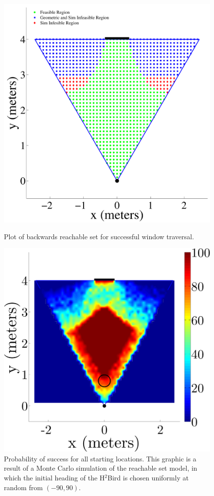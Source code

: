 \documentclass{aamas2013}
\begin{document}
\begin{figure}[tb]
\begin{minipage}[b]{0.45\linewidth}
\includegraphics[width=\textwidth]{figures/feasible_set.pdf}
\caption{Plot of backwards reachable set for successful window traversal.}
\label{fig:feasible_set}
\end{minipage}
\hfill
\begin{minipage}[b]{0.45\linewidth}
\centering
\centering
\includegraphics[width=\textwidth]{figures/heat_map.png}
\caption{Probability of success for all starting locations. This graphic is 
a result of a Monte Carlo simulation of the reachable set model, in which the 
initial heading of the H$^2$Bird is chosen uniformly at random from $(-90,90)$.}
\label{fig:heat_map}
\end{minipage}
\end{figure}
\end{document}
